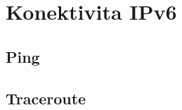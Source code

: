 \documentclass[czech,master,dept460,male,cpp,cpdeclaration]{diploma}
\begin{document}
\newpage
\section{Konektivita IPv6}
\label{sec:Sec12}

\subsection{Ping}
\label{sec:Sec121}

\subsection{Traceroute}
\label{sec:Sec122}
\end{document}
